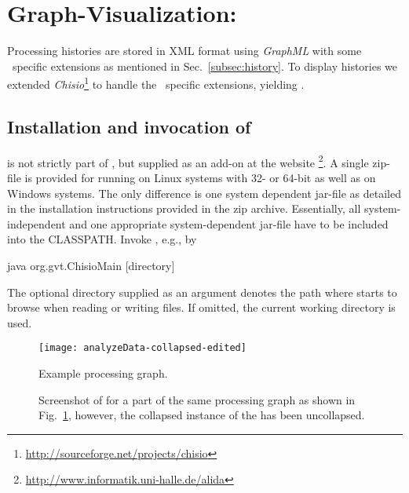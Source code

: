 \section{Graph-Visualization: \mtbc}
\label{app:chipory}

Processing histories are stored in XML format using {\em GraphML} with some
\alida\ specific extensions as mentioned in Sec.~\ref{subsec:history}.
To display histories we extended
{\em Chisio}\footnote{\href{http://sourceforge.net/projects/chisio}
{http://sourceforge.net/projects/chisio}} to handle the \alida\ specific
extensions, yielding \mtbc.

\subsection{Installation and invocation of \mtbc}

\mtbc is not strictly part of \alida, but supplied as an add-on
at the \alida website%
\footnote{\href{http://www.informatik.uni-halle.de/alida}{http://www.informatik.uni-halle.de/alida}}.
A single zip-file is provided for running \mtbc on Linux systems with 32- or
64-bit as well as on Windows systems. The only difference is one system
dependent jar-file as detailed in the installation instructions provided in the zip archive.
Essentially, all system-independent and one appropriate system-dependent
jar-file have to be included into the CLASSPATH.
Invoke \mtbc, e.g., by
\vspace*{0.5cm}
\begin{code}
  java org.gvt.ChisioMain [directory]
\end{code}

\vspace*{-0.25cm}
The optional directory supplied as an argument denotes the path where
\mtbc starts to browse when reading or writing files.
If omitted, the current working directory is used.

\begin{figure}[ht]
{\centerline{{\texttt{[image: analyzeData-collapsed-edited]}}}}
\caption[Example of a processing graph.]{\label{fig:DAG-repeat}
Example processing graph.
}
\end{figure}

\begin{figure}
\begin{center}
{}
\caption{\label{fig:exa}Screenshot of \mtbc for a part of the same processing graph as shown in
Fig.~\ref{fig:DAG-repeat}, however, the collapsed instance of the
 has been uncollapsed.}
\end{center}
\end{figure}

